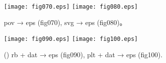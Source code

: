 \documentclass[a4paper,12pt]{jsarticle}
\begin{document}
\begin{figure}[!htbp]
  \begin{center}
  \texttt{[image: fig070.eps]} %
  \texttt{[image: fig080.eps]} %
  \end{center}
  \caption{
    \label{fig070_080}
    pov → eps (fig070),
    svg → eps (fig080)。
  }
\end{figure}

\begin{figure}[!htbp]
  \begin{center}
  \texttt{[image: fig090.eps]} %
  \texttt{[image: fig100.eps]} %
  \end{center}
  \caption{(\the\tmpId)
    \label{fig090_100}
    rb + dat → eps (fig090),
    plt + dat → eps (fig100).
  }
\end{figure}
\end{document}
